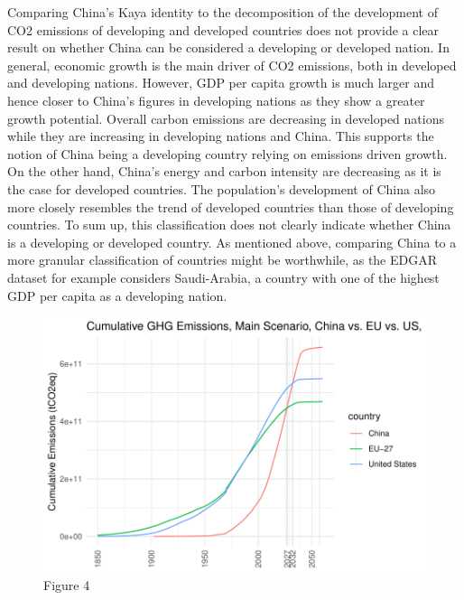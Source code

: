 \documentclass[
  12pt,
]{article}
\numberwithin{equation}{section}
\numberwithin{table}{section}
\numberwithin{figure}{section}
\begin{document}
Comparing China's Kaya identity to the decomposition of the development
of CO2 emissions of developing and developed countries does not provide
a clear result on whether China can be considered a developing or
developed nation. In general, economic growth is the main driver of CO2
emissions, both in developed and developing nations. However, GDP per
capita growth is much larger and hence closer to China's figures in
developing nations as they show a greater growth potential. Overall
carbon emissions are decreasing in developed nations while they are
increasing in developing nations and China. This supports the notion of
China being a developing country relying on emissions driven growth. On
the other hand, China's energy and carbon intensity are decreasing as it
is the case for developed countries. The population's development of
China also more closely resembles the trend of developed countries than
those of developing countries. To sum up, this classification does not
clearly indicate whether China is a developing or developed country. As
mentioned above, comparing China to a more granular classification of
countries might be worthwhile, as the EDGAR dataset for example
considers Saudi-Arabia, a country with one of the highest GDP per capita
as a developing nation.

\begin{figure}
\centering
\includegraphics{Paper_files/figure-latex/unnamed-chunk-4-1.pdf}
\caption{Figure 4}
\end{figure}
\end{document}
